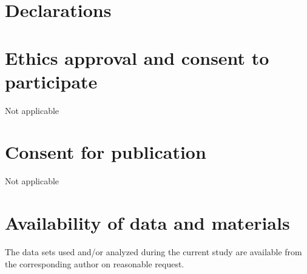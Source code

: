 \documentclass{bmcart}
\begin{document}

\clearpage %








\begin{backmatter}



\section*{Declarations} 
\hfill


\section*{Ethics approval and consent to participate}

Not applicable


\section*{Consent for publication}

Not applicable

\section*{Availability of data and materials}

The data sets used and/or analyzed during the current study are available from the corresponding author on reasonable request.


\end{backmatter}
\end{document}
